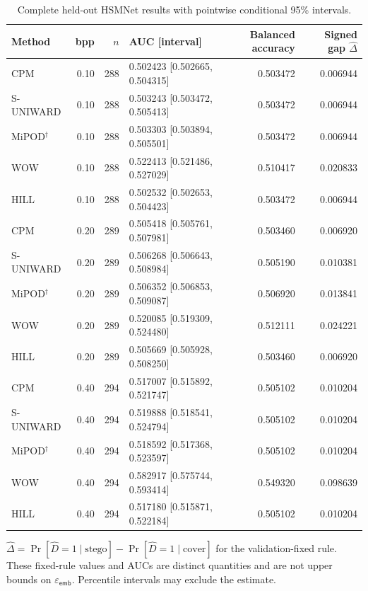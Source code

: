 \documentclass[journal]{IEEEtran}
\renewcommand{\arraystretch}{1.2}
\renewcommand{\arraystretch}{1.0}
\theoremstyle{definition}
\theoremstyle{game}
\renewcommand{\arraystretch}{1.5}
\begin{document}
\begin{table}[!t]
\centering\footnotesize
\caption{Complete held-out HSMNet results with pointwise conditional 95\% intervals.}
\label{tab:hsm-detection}
\setlength{\tabcolsep}{4pt}\renewcommand{\arraystretch}{1.15}
\begin{tabular}{lrrlrr}
\toprule
Method & bpp & $n$ & AUC [interval] & Balanced accuracy & Signed gap $\widehat\Delta$\\
\midrule
CPM & 0.10 & 288 & 0.502423 [0.502665, 0.504315] & 0.503472 & 0.006944\\
S-UNIWARD & 0.10 & 288 & 0.503243 [0.503472, 0.505413] & 0.503472 & 0.006944\\
MiPOD$^\dagger$ & 0.10 & 288 & 0.503303 [0.503894, 0.505501] & 0.503472 & 0.006944\\
WOW & 0.10 & 288 & 0.522413 [0.521486, 0.527029] & 0.510417 & 0.020833\\
HILL & 0.10 & 288 & 0.502532 [0.502653, 0.504423] & 0.503472 & 0.006944\\
CPM & 0.20 & 289 & 0.505418 [0.505761, 0.507981] & 0.503460 & 0.006920\\
S-UNIWARD & 0.20 & 289 & 0.506268 [0.506643, 0.508984] & 0.505190 & 0.010381\\
MiPOD$^\dagger$ & 0.20 & 289 & 0.506352 [0.506853, 0.509087] & 0.506920 & 0.013841\\
WOW & 0.20 & 289 & 0.520085 [0.519309, 0.524480] & 0.512111 & 0.024221\\
HILL & 0.20 & 289 & 0.505669 [0.505928, 0.508250] & 0.503460 & 0.006920\\
CPM & 0.40 & 294 & 0.517007 [0.515892, 0.521747] & 0.505102 & 0.010204\\
S-UNIWARD & 0.40 & 294 & 0.519888 [0.518541, 0.524794] & 0.505102 & 0.010204\\
MiPOD$^\dagger$ & 0.40 & 294 & 0.518592 [0.517368, 0.523597] & 0.505102 & 0.010204\\
WOW & 0.40 & 294 & 0.582917 [0.575744, 0.593414] & 0.549320 & 0.098639\\
HILL & 0.40 & 294 & 0.517180 [0.515871, 0.522184] & 0.505102 & 0.010204\\
\bottomrule
\end{tabular}
\par\smallskip\parbox{.97\textwidth}{\footnotesize $\widehat\Delta=\Pr[\widehat D=1\mid\mathrm{stego}]-\Pr[\widehat D=1\mid\mathrm{cover}]$ for the validation-fixed rule. These fixed-rule values and AUCs are distinct quantities and are not upper bounds on $\varepsilon_{\mathsf{emb}}$. Percentile intervals may exclude the estimate.}
\end{table}
\end{document}
